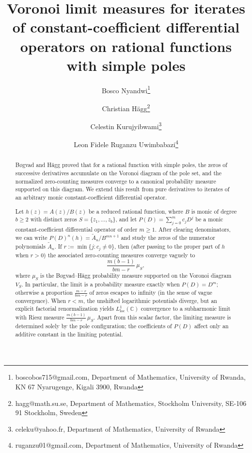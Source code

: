 \documentclass[12pt]{article}
\theoremstyle{plain}
\theoremstyle{definition}
\begin{document}
\title{Voronoi limit measures for iterates of constant-coefficient differential operators on rational 
functions with simple poles}

\author{Bosco Nyandwi\thanks{boscobos715@gmail.com, Department of Mathematics, University of Rwanda, KN 67 Nyarugenge, Kigali 3900, Rwanda} \and 
Christian H\"agg\thanks{hagg@math.su.se, Department of Mathematics, Stockholm University, SE-106 91 Stockholm, Sweden} \and 
Celestin Kurujyibwami\thanks{celeku@yahoo.fr, Department of Mathematics, University of Rwanda} \and 
Leon Fidele Ruganzu Uwimbabazi\thanks{ruganzu01@gmail.com, Department of Mathematics, University of Rwanda}}

\date{}

\maketitle

\begin{abstract}
B\o gvad and H\"agg proved that for a rational function with simple poles, the zeros of successive 
derivatives accumulate on the Voronoi diagram of the pole set, and the normalized zero-counting measures 
converge to a canonical probability measure supported on this diagram. We extend this result from pure 
derivatives to iterates of an arbitrary monic constant-coefficient differential operator.

Let $h(z)=A(z)/B(z)$ be a reduced rational function, where $B$ is monic of degree $b\ge2$ with distinct
 zeros $S=\{z_1,\dots,z_b\}$, and let $P(D)=\sum_{j=0}^m c_jD^j$ be a monic constant-coefficient 
differential operator of order $m\ge1$. After clearing denominators, we can write
 $P(D)^n(h)=\widetilde A_n/B^{mn+1}$ and study the zeros of the numerator polynomials $\widetilde A_n$. 
If $r:=\min\{j:c_j\neq0\}$, then (after passing to the proper part of $h$ when $r>0$) the associated 
zero-counting measures converge vaguely to
$$\frac{m(b-1)}{bm-r}\,\mu_S,$$
where $\mu_S$ is the B\o gvad--H\"agg probability measure supported on the Voronoi diagram $V_S$.
 In particular, the limit is a probability measure exactly when $P(D)=D^m$; otherwise a proportion
 $\frac{m-r}{bm-r}$ of zeros escapes to infinity (in the sense of vague convergence). When $r<m$,
 the unshifted logarithmic potentials diverge, but an explicit factorial renormalization yields 
$L^1_{\mathrm{loc}}(\mathbb C)$ convergence to a subharmonic limit with Riesz measure 
$\frac{m(b-1)}{bm-r}\,\mu_S$. Apart from this scalar factor, the limiting measure is determined 
solely by the pole configuration; the coefficients of $P(D)$ affect only an additive constant in the
 limiting potential.
\end{abstract}
\end{document}
